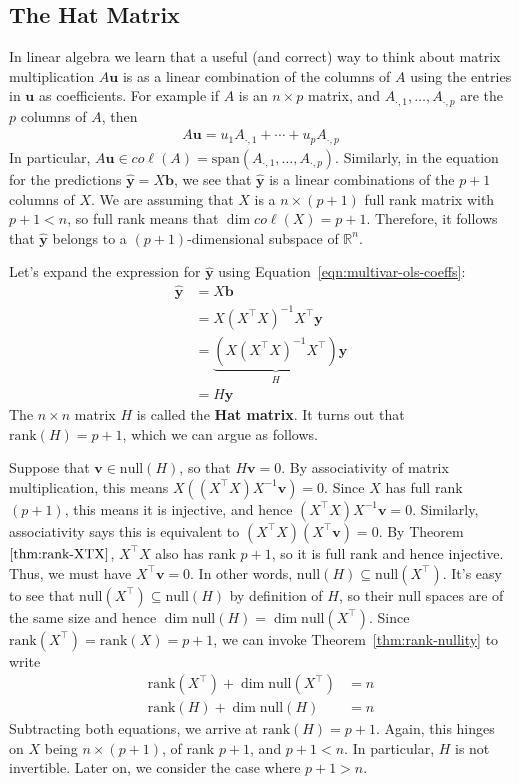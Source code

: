 \documentclass[12pt, a4paper]{article}
\theoremstyle{definition}
\begin{document}
	\subsection*{The Hat Matrix}
	In linear algebra we learn that a useful (and correct) way to think about matrix
	multiplication $A\mathbf{u}$ is as a linear combination of the columns of $A$ using the
	entries in $\mathbf{u}$ as coefficients. For example if $A$ is an $n\times p$ matrix,
	and ${A}_{\cdot, 1},\ldots,{A}_{\cdot, p}$ are the $p$ columns
	of $A$, then
	\begin{align*}
		A\mathbf{u}=u_1 A_{\cdot, 1} + \cdots + u_p A_{\cdot, p}
	\end{align*}
	In particular, $A\mathbf{u}\in co\ell(A)=\text{span}(A_{\cdot, 1},\ldots,A_{\cdot, p})$.
	Similarly, in the equation for the predictions $\hat{\mathbf{y}}=X\mathbf{b}$,
	we see that $\hat{\mathbf{y}}$ is a linear combinations of the $p+1$ columns
	of $X$. We are assuming that $X$ is a $n\times (p+1)$ full rank matrix with
	$p + 1 < n$, so full rank means that $\dim co\ell (X) = p+1$. Therefore,
	it follows that $\hat{\mathbf{y}}$ belongs to a $(p+1)$-dimensional subspace
	of $\mathbb{R}^n$.
	
	Let's expand the expression for $\hat{\mathbf{y}}$ using Equation~\ref{eqn:multivar-ols-coeffs}:
	\begin{align}
		\hat{\mathbf{y}} &= X \mathbf{b}\nonumber\\
		&=X(X^\top X)^{-1}X^\top  \mathbf{y}\nonumber\\
		&=\underbrace{(X(X^\top X)^{-1} X^\top)}_{H}\mathbf{y}\nonumber\\
		&=H\mathbf{y}\label{eqn:hat-matrix}
	\end{align}
	The $n\times n$ matrix $H$ is called the \textbf{Hat matrix}. It turns out
	that $\text{rank}(H) = p +1$, which we can argue as follows.
	
	Suppose that
	$\mathbf{v}\in \text{null}(H)$, so that $H\mathbf{v}=0$. By associativity
	of matrix multiplication, this means $X((X^\top X)X^{-1}\mathbf{v})=0$.
	Since $X$ has full rank $(p+1)$, this means it is injective, and hence
	$(X^\top X)X^{-1}\mathbf{v}=0$. Similarly, associativity says this is equivalent
	to $(X^\top X)(X^\top\mathbf{v})=0$. By Theorem~$\ref{thm:rank-XTX}$, $X^\top X$
	also has rank $p+1$, so it is full rank and hence injective. Thus, we must have
	$X^\top\mathbf{v}=0$. In other words, $\text{null}(H)\subseteq \text{null}(X^\top)$.
	It's easy to see that $\text{null}(X^\top)\subseteq \text{null}(H)$ by definition of
	$H$, so their null spaces are of the same size and hence $\dim \text{null}(H) = \dim\text{null}(X^\top)$.
	Since $\text{rank}(X^\top)=\text{rank}(X)=p+1$, we can invoke Theorem~\ref{thm:rank-nullity}
	to write
	\begin{align*}
		\text{rank}(X^\top) + \dim\text{null}(X^\top) &= n\\
		\text{rank}(H) + \dim\text{null}(H) &= n
	\end{align*}
	Subtracting both equations, we arrive at $\text{rank}(H) = p+1$. Again, this hinges
	on $X$ being $n\times (p+1)$, of rank $p+1$, and $p+1 < n$. In particular, $H$
	is not invertible. Later on, we consider the case where $p+1 > n$.
\end{document}
